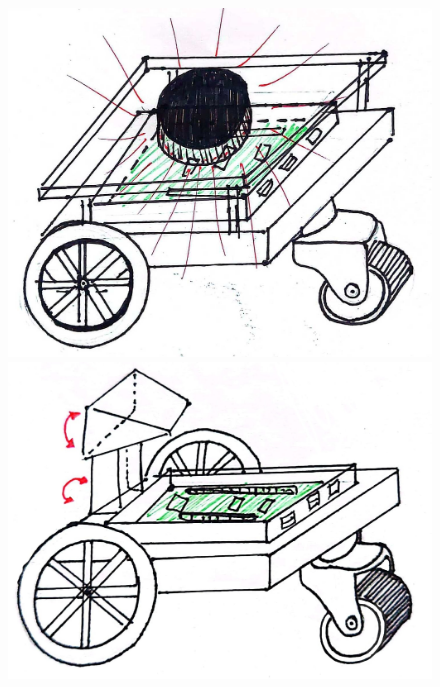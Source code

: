 \begin{figure}[ht!]
	\centering
	\begin{minipage}{0.4\linewidth}
		\centering
		\includegraphics[width=\linewidth]{figs/cap5/prototipo_laser.jpeg}
	\end{minipage}
	\hspace{2cm}
	\begin{minipage}{0.4\linewidth}
		\centering
		\includegraphics[width=\linewidth]{figs/cap5/prototipo_sin_laser.jpeg}
	\end{minipage}
	\hspace{2cm}
	\begin{minipage}{0.5\linewidth}

\end{minipage}
\end{figure}
